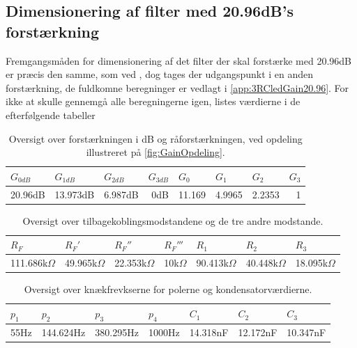 \subsection{Dimensionering af filter med 20.96dB's forstærkning}
\label{DimensioneringAfFilter20.96}
%
Fremgangsmåden for dimensionering af det filter der skal forstærke med 20.96dB er præcis den samme, som ved , dog tages der udgangspunkt i en anden forstærkning, de fuldkomne beregninger er vedlagt i \autoref{app:3RCledGain20.96}. For ikke at skulle gennemgå alle beregningerne igen, listes værdierne i de efterfølgende tabeller
%
\begin{table}[H]
\centering
\begin{tabular}{|r|r|r|r|r|r|r|r|}
\hline
\multicolumn{1}{|l|}{$G_{0dB}$} & \multicolumn{1}{l|}{$G_{1dB}$} & \multicolumn{1}{l|}{$G_{2dB}$} & \multicolumn{1}{l|}{$G_{3dB}$} & \multicolumn{1}{l|}{$G_0$} & \multicolumn{1}{l|}{$G_1$} & \multicolumn{1}{l|}{$G_2$} & \multicolumn{1}{l|}{$G_3$} \\ \hline
20.96dB & 13.973dB & 6.987dB & 0dB & 11.169 & 4.9965 & 2.2353 & 1\\ \hline
\end{tabular}
\caption{Oversigt over forstærkningen i dB og råforstærkningen, ved opdeling illustreret på \autoref{fig:GainOpdeling}.}
\label{tab:DimensioneringAf20.96Gain}
\end{table}
\noindent
%
%
\begin{table}[H]
\centering
\begin{tabular}{|r|r|r|r|r|r|r|}
\hline
\multicolumn{1}{|l|}{$R_F$} & \multicolumn{1}{l|}{$R_F'$} & \multicolumn{1}{l|}{$R_F''$} & \multicolumn{1}{l|}{$R_F'''$} & \multicolumn{1}{l|}{$R_1$} & \multicolumn{1}{l|}{$R_2$} & \multicolumn{1}{l|}{$R_3$} \\ \hline
111.686k$\Omega$ & 49.965k$\Omega$ & 22.353k$\Omega$ & 10k$\Omega$ & 90.413k$\Omega$ & 40.448k$\Omega$ & 18.095k$\Omega$\\ \hline
\end{tabular}
\caption{Oversigt over tilbagekoblingsmodstandene og de tre andre modstande.}
\label{tab:DimensioneringAf20.96Modstand}
\end{table}
\noindent
%
%
\begin{table}[H]
\centering
\begin{tabular}{|r|r|r|r|r|r|r|}
\hline
\multicolumn{1}{|l|}{$p_1$} & \multicolumn{1}{l|}{$p_2$} & \multicolumn{1}{l|}{$p_3$} & \multicolumn{1}{l|}{$p_4$} & \multicolumn{1}{l|}{$C_1$} & \multicolumn{1}{l|}{$C_2$} & \multicolumn{1}{l|}{$C_3$} \\ \hline
55Hz & 144.624Hz & 380.295Hz & 1000Hz & 14.318nF & 12.172nF & 10.347nF \\ \hline
\end{tabular}
\caption{Oversigt over knækfrevkserne for polerne og kondensatorværdierne.}
\label{tab:DimensioneringAf20.96polC}
\end{table}
\noindent
%